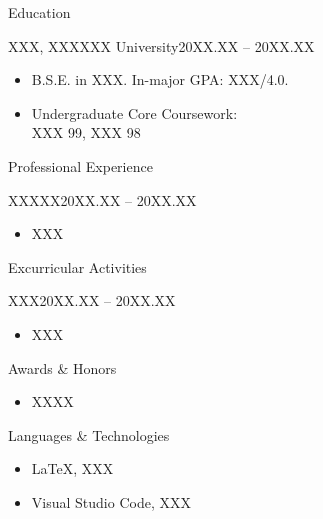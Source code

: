 \documentclass[]{simplecv}
\begin{document}
	\makeheader
	
	\begin{cvsection}{Education}
		\begin{cvsubsection}{XXX, XXX}{XXX University}{20XX.XX -- 20XX.XX}
			\begin{itemize}
				\item B.S.E. in XXX.  In-major GPA: XXX/4.0.
				\item Undergraduate Core Coursework: \\ 
				XXX 99, XXX 98
			\end{itemize}
		\end{cvsubsection}
	\end{cvsection}

	\begin{cvsection}{Professional Experience}		
		\begin{cvsubsection}{XXXXX}{}{20XX.XX -- 20XX.XX}		
			\begin{itemize}
				\item XXX
			\end{itemize}
		\end{cvsubsection}
	\end{cvsection}
	
	\begin{cvsection}{Excurricular Activities}
		\begin{cvsubsection}{XXX}{}{20XX.XX -- 20XX.XX}
			\begin{itemize}
				\item XXX
			\end{itemize}
		\end{cvsubsection}

	\end{cvsection}
	
	\begin{cvsection}{Awards \& Honors}
		\begin{cvsubsection}{}{}{}	
			\begin{itemize}
				\item XXXX
			\end{itemize}
		\end{cvsubsection}
	\end{cvsection}
	
	\begin{cvsection}{Languages \& Technologies}
		\begin{cvsubsection}{}{}{}	
			\begin{itemize}
				\item \LaTeX, XXX
				\item Visual Studio Code, XXX
			\end{itemize}
		\end{cvsubsection}
	\end{cvsection}
\end{document}
